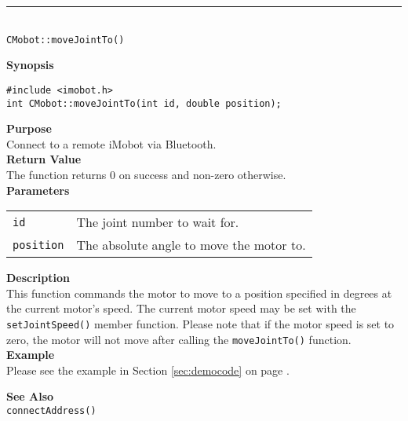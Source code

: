 \noindent
\vspace{5pt}
\rule{4.5in}{0.015in}\\
\noindent
{\LARGE \texttt{CMobot::moveJointTo()}}\\
{}

\noindent
{\bf Synopsis}\\
\begin{verbatim}
#include <imobot.h>
int CMobot::moveJointTo(int id, double position);
\end{verbatim}

\noindent
{\bf Purpose}\\
Connect to a remote iMobot via Bluetooth.\\

\noindent
{\bf Return Value}\\
The function returns 0 on success and non-zero otherwise.\\

\noindent
{\bf Parameters}\\
\vspace{-0.1in}
\begin{description}
\item               
\begin{tabular}{p{10 mm}p{145 mm}}
\texttt{id} & The joint number to wait for. \\
\texttt{position} & The absolute angle to move the motor to.  \\
\end{tabular}
\end{description}

\noindent
{\bf Description}\\
This function commands the motor to move to a position specified in degrees at
the current motor's speed. The current motor speed may be set with the
\texttt{setJointSpeed()} member function. Please note that if the motor speed
is set to zero, the motor will not move after calling the
\texttt{moveJointTo()} function. \\

\noindent
{\bf Example}\\
Please see the example in Section \ref{sec:democode} on page \pageref{sec:democode}.\\
\noindent

\noindent
{\bf See Also}\\
\texttt{connectAddress()}

